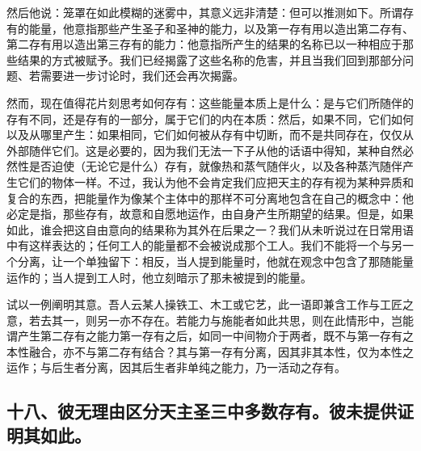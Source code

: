 然后他说：笼罩在如此模糊的迷雾中，其意义远非清楚：但可以推测如下。所谓存有的能量，他意指那些产生圣子和圣神的能力，以及第一存有用以造出第二存有、第二存有用以造出第三存有的能力：他意指所产生的结果的名称已以一种相应于那些结果的方式被赋予。我们已经揭露了这些名称的危害，并且当我们回到那部分问题、若需要进一步讨论时，我们还会再次揭露。\par

然而，现在值得花片刻思考如何存有：这些能量本质上是什么：是与它们所随伴的存有不同，还是存有的一部分，属于它们的内在本质：然后，如果不同，它们如何以及从哪里产生：如果相同，它们如何被从存有中切断，而不是共同存在，仅仅从外部随伴它们。这是必要的，因为我们无法一下子从他的话语中得知，某种自然必然性是否迫使（无论它是什么）存有，就像热和蒸气随伴火，以及各种蒸汽随伴产生它们的物体一样。不过，我认为他不会肯定我们应把天主的存有视为某种异质和复合的东西，把能量作为像某个主体中的那样不可分离地包含在自己的概念中：他必定是指，那些存有，故意和自愿地运作，由自身产生所期望的结果。但是，如果如此，谁会把这自由意向的结果称为其外在后果之一？我们从未听说过在日常用语中有这样表达的；任何工人的能量都不会被说成那个工人。我们不能将一个与另一个分离，让一个单独留下：相反，当人提到能量时，他就在观念中包含了那随能量运作的；当人提到工人时，他立刻暗示了那未被提到的能量。\par

试以一例阐明其意。吾人云某人操铁工、木工或它艺，此一语即兼含工作与工匠之意，若去其一，则另一亦不存在。若能力与施能者如此共思，则在此情形中，岂能谓产生第二存有之能力第一存有之后，如同一中间物介于两者，既不与第一存有之本性融合，亦不与第二存有结合？其与第一存有分离，因其非其本性，仅为本性之运作；与后生者分离，因其后生者非单纯之能力，乃一活动之存有。\par


\subsection{十八、彼无理由区分天主圣三中多数存有。彼未提供证明其如此。}

